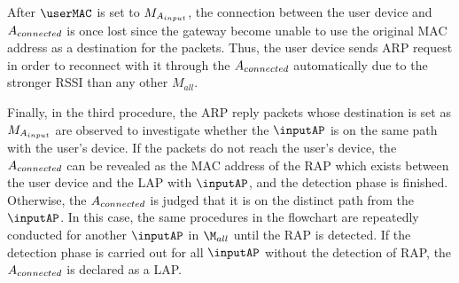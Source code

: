 \documentclass[conference]{IEEEtran}
\begin{document}
After $\userMAC$ is set to $M_{A_{input}}$, the connection between the user device and $A_{connected}$ is once lost since the gateway become unable to use the original MAC address as a destination for the packets.
Thus, the user device sends ARP request in order to reconnect with it through the $A_{connected}$ automatically due to the stronger RSSI than any other $M_{all}$.

Finally, in the third procedure, the ARP reply packets whose destination is set as $M_{A_{input}}$ are observed to investigate whether the $\inputAP$ is on the same path with the user's device.
If the packets do not reach the user's device, the $A_{connected}$ can be revealed as the MAC address of the RAP which exists between the user device and the LAP with  $\inputAP$, and the detection phase is finished.
Otherwise, the $A_{connected}$ is judged that it is on the distinct path from the $\inputAP$.
In this case, the same procedures in the flowchart are repeatedly conducted for another $\inputAP$ in $\M_{all}$ until the RAP is detected.
If the detection phase is carried out for all $\inputAP$ without the detection of RAP, the $A_{connected}$ is declared as a LAP. 
\end{document}
